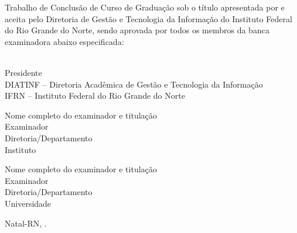 \begin{folhadeaprovacao}
	\setlength{\ABNTsignthickness}{0.4pt}
	\setlength{\ABNTsignwidth}{10cm}

	\noindent
	Trabalho de Conclusão de Curso de Graduação sob o título
	\textit{\myThesis} apresentada por \myName{ }e aceita pelo Diretoria
	de Gestão e Tecnologia da Informação do Instituto Federal do Rio Grande do
	Norte, sendo aprovada por todos os membros da banca examinadora abaixo especificada:

	\assinatura
	{
	{\mySupervisorName}   			                  \\
	{\small Presidente}											          \smallskip\\
	{\footnotesize
	DIATINF -- Diretoria Acadêmica de Gestão e Tecnologia da Informação		   \\
	IFRN -- Instituto Federal do Rio Grande do Norte
	}
	}

	\assinatura
	{
	Nome completo do examinador e titulação   			                  \\
	{\small Examinador}											          \smallskip\\
	{\footnotesize
	Diretoria/Departamento		\\
	Instituto
	}
	}

	\assinatura
	{
	Nome completo do examinador e titulação   			                  \\
	{\small Examinador}											          \smallskip\\
	{\footnotesize
	Diretoria/Departamento		\\
	Universidade
	}
	}

	\vfill

	\begin{center}
		Natal-RN, \myDefenseDate.
	\end{center}
\end{folhadeaprovacao}
